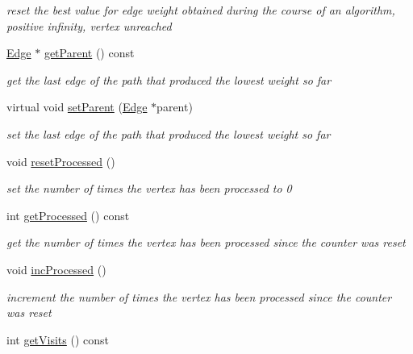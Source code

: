 \begin{DoxyCompactItemize}
\begin{DoxyCompactList}\small\item\em reset the best value for edge weight obtained during the course of an algorithm, positive infinity, vertex unreached \end{DoxyCompactList}\item 
\hyperlink{class_edge}{Edge} $\ast$ \hyperlink{class_vertex_afa6a4c6fa429a1b1f4d707a226e0fc9a}{get\+Parent} () const 
\begin{DoxyCompactList}\small\item\em get the last edge of the path that produced the lowest weight so far \end{DoxyCompactList}\item 
virtual void \hyperlink{class_vertex_a330546da58f086e183ae8ee41f5eb7fb}{set\+Parent} (\hyperlink{class_edge}{Edge} $\ast$parent)
\begin{DoxyCompactList}\small\item\em set the last edge of the path that produced the lowest weight so far \end{DoxyCompactList}\item 
\hypertarget{class_vertex_a42a3c40617d40971eb5745738166b3a8}{}void \hyperlink{class_vertex_a42a3c40617d40971eb5745738166b3a8}{reset\+Processed} ()\label{class_vertex_a42a3c40617d40971eb5745738166b3a8}

\begin{DoxyCompactList}\small\item\em set the number of times the vertex has been processed to 0 \end{DoxyCompactList}\item 
\hypertarget{class_vertex_ae43f5e09052c8ae57f98f00d60d6c053}{}int \hyperlink{class_vertex_ae43f5e09052c8ae57f98f00d60d6c053}{get\+Processed} () const \label{class_vertex_ae43f5e09052c8ae57f98f00d60d6c053}

\begin{DoxyCompactList}\small\item\em get the number of times the vertex has been processed since the counter was reset \end{DoxyCompactList}\item 
\hypertarget{class_vertex_adf49c348f0412081ce1a479724797894}{}void \hyperlink{class_vertex_adf49c348f0412081ce1a479724797894}{inc\+Processed} ()\label{class_vertex_adf49c348f0412081ce1a479724797894}

\begin{DoxyCompactList}\small\item\em increment the number of times the vertex has been processed since the counter was reset \end{DoxyCompactList}\item 
\hypertarget{class_vertex_a625f7958571b972389493203547c5b42}{}int \hyperlink{class_vertex_a625f7958571b972389493203547c5b42}{get\+Visits} () const \label{class_vertex_a625f7958571b972389493203547c5b42}


\end{DoxyCompactItemize}

